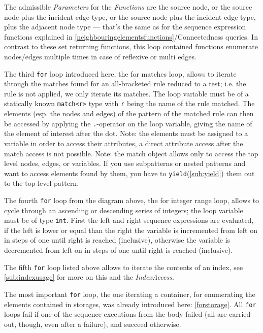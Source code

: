 The admissible \emph{Parameters} for the \emph{Functions} are the source node, or the source node plus the incident edge type, or the source node plus the incident edge type, plus the adjacent node type ---
that's the same as for the sequence expression functions explained in \ref{neighbouringelementsfunctions}/Connectedness queries.
In contrast to these set returning functions, this loop contained functions enumerate nodes/edges multiple times in case of reflexive or multi edges.

The third \texttt{for} loop introduced here, the for matches loop, allows to iterate through the matches found for an all-bracketed rule reduced to a test; i.e. the rule is not applied, we only iterate its matches.
The loop variable must be of a statically known \texttt{match<r>} type with \texttt{r} being the name of the rule matched.
The elements (esp. the nodes and edges) of the pattern of the matched rule can then be accessed by applying the \texttt{.}-operator on the loop variable, giving the name of the element of interest after the dot.
Note: the elements must be assigned to a variable in order to access their attributes, a direct attribute access after the match access is not possible.
Note: the match object allows only to access the top level nodes, edges, or variables.
If you use subpatterns or nested patterns and want to access elements found by them, you have to \texttt{yield}(\ref{sub:yield}) them out to the top-level pattern.

The fourth \texttt{for} loop from the diagram above, the for integer range loop, allows to cycle through an ascending or descending series of integers; the loop variable must be of type \texttt{int}.
First the left and right sequence expressions are evaluated,
if the left is lower or equal than the right the variable is incremented from left on in steps of one until right is reached (inclusive),
otherwise the variable is decremented from left on in steps of one until right is reached (inclusive).

The fifth \texttt{for} loop listed above allows to iterate the contents of an index, see \ref{sub:indexusage} for more on this and the \emph{IndexAccess}.

The most important \texttt{for} loop, the one iterating a container, for enumerating the elements contained in storages, was already introduced here: \ref{forstorage}.
All \texttt{for} loops fail if one of the sequence executions from the body failed (all are carried out, though, even after a failure), and succeed otherwise.

